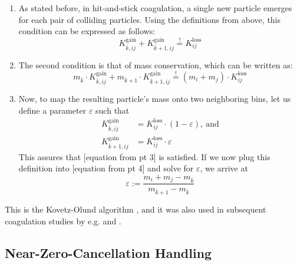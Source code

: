 \begin{enumerate}
            \item As stated before, in hit-and-stick coagulation, a single new particle emerges
                for each pair of colliding particles. Using the definitions from above, this
                condition can be expressed as follows:
                \begin{equation}
                    K_{\bar k,ij}^\text{gain}
                    +K_{\bar k+1,ij}^\text{gain}
                    \overset{!}{=}K_{ij}^\text{loss}
                \end{equation}
            \item The second condition is that of mass conservation, which can be written as:
                \begin{equation}
                    m_{\bar k}\cdot K_{\bar k,ij}^\text{gain}
                    +m_{\bar k+1}\cdot K_{\bar k+1,ij}^\text{gain}
                    \overset{!}{=}(m_i+m_j)\cdot K_{ij}^\text{loss}
                \end{equation}
            \item Now, to map the resulting particle's mass onto two neighboring bins, let us    
                define a parameter $\varepsilon$ such that
                \begin{align}
                    K_{\bar k,ij}^\text{gain}
                        &=K_{ij}^\text{loss}\cdot(1-\varepsilon),\ \text{and}\\
                    K_{\bar k+1,ij}^\text{gain}
                        &=K_{ij}^\text{loss}\cdot\varepsilon
                \end{align}
                This assures that [equation from pt 3] is satisfied. If we now plug this
                definition into [equation from pt 4] and solve for $\varepsilon$, we
                arrive at
                \begin{equation}
                    \varepsilon
                        :=\frac{m_i+m_j-m_{\bar k}}{m_{\bar k+1}-m_{\bar k}}
                \end{equation}
        \end{enumerate}
        This is the Kovetz-Olund algorithm \cite{kovetz_olund_1969}, and it was also used in subsequent 
        coagulation studies by e.g. \cite{brauer_dullemond_henning_2007} and 
        \cite{birnstiel_dullemond_brauer_2010}.
    
    \newpage\subsection{Near-Zero-Cancellation Handling}
    
